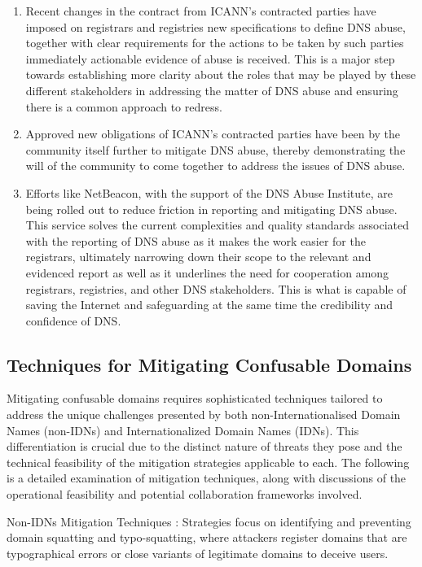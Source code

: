 \begin{enumerate}
  \item Recent changes in the contract from ICANN's contracted parties have imposed on registrars and registries new specifications to define DNS abuse, together with clear requirements for the actions to be taken by such parties immediately actionable evidence of abuse is received. This is a major step towards establishing more clarity about the roles that may be played by these different stakeholders in addressing the matter of DNS abuse and ensuring there is a common approach to redress. \cite{Weinstein2023}
  \item Approved new obligations of ICANN's contracted parties have been by the community itself further to mitigate DNS abuse, thereby demonstrating the will of the community to come together to address the issues of DNS abuse. \cite{ICANN2023}
  \item Efforts like NetBeacon, with the support of the DNS Abuse Institute, are being rolled out to reduce friction in reporting and mitigating DNS abuse. This service solves the current complexities and quality standards associated with the reporting of DNS abuse as it makes the work easier for the registrars, ultimately narrowing down their scope to the relevant and evidenced report as well as it underlines the need for cooperation among registrars, registries, and other DNS stakeholders. This is what is capable of saving the Internet and safeguarding at the same time the credibility and confidence of DNS. \cite{NetBeacon}
  
\end{enumerate}

\subsection{Techniques for Mitigating Confusable Domains}

Mitigating confusable domains requires sophisticated techniques tailored to address the unique challenges presented by both non-Internationalised Domain Names (non-IDNs) and Internationalized Domain Names (IDNs). This differentiation is crucial due to the distinct nature of threats they pose and the technical feasibility of the mitigation strategies applicable to each. The following is a detailed examination of mitigation techniques, along with discussions of the operational feasibility and potential collaboration frameworks involved.

Non-IDNs Mitigation Techniques : Strategies focus on identifying and preventing domain squatting and typo-squatting, where attackers register domains that are typographical errors or close variants of legitimate domains to deceive users.

